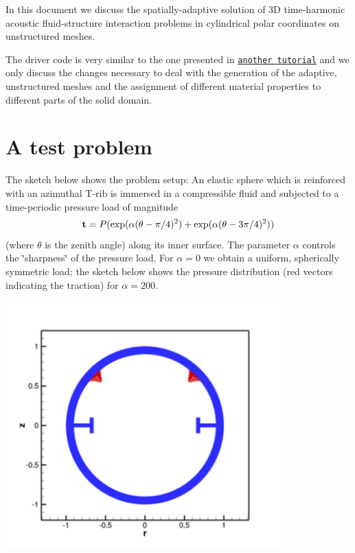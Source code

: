 In this document we discuss the spatially-\/adaptive solution of 3D time-\/harmonic acoustic fluid-\/structure interaction problems in cylindrical polar coordinates on unstructured meshes.

The driver code is very similar to the one presented in \href{../../sphere/html/index.html}{\tt another tutorial} and we only discuss the changes necessary to deal with the generation of the adaptive, unstructured meshes and the assignment of different material properties to different parts of the solid domain.



 

\hypertarget{index_test}{}\section{A test problem}\label{index_test}
The sketch below shows the problem setup\+: An elastic sphere which is reinforced with an azimuthal T-\/rib is immersed in a compressible fluid and subjected to a time-\/periodic pressure load of magnitude \[ {\bf t} = P ( \exp(\alpha(\theta-\pi/4)^2) + \exp(\alpha(\theta-3\pi/4)^2) ) \] (where $ \theta $ is the zenith angle) along its inner surface. The parameter $ \alpha $ controls the \char`\"{}sharpness\char`\"{} of the pressure load. For $ \alpha=0 $ we obtain a uniform, spherically symmetric load; the sketch below shows the pressure distribution (red vectors indicating the traction) for $ \alpha = 200. $

 
\begin{DoxyImage}
\includegraphics[width=0.8\textwidth]{setup}
\end{DoxyImage}




